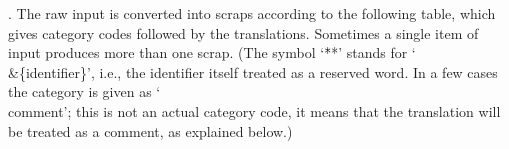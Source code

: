 . The raw input is converted into scraps according to the following table,
which gives category codes followed by the translations. Sometimes a single
item of input produces more than one scrap.
\def\stars {\.{**}}%
(The symbol `\stars' stands for `\.{\\\&\{{\rm identifier}\}}',
i.e., the identifier itself treated as a reserved word. In a few cases the
category is given as `\\{comment}'; this is not an actual category code, it
means that the translation will be treated as a comment, as explained
below.)

\yskip{}
